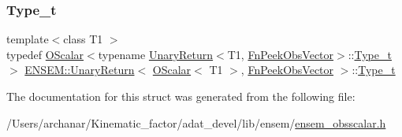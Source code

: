 \subsubsection{\texorpdfstring{Type\_t}{Type\_t}\hspace{0.1cm}{\footnotesize\ttfamily [2/2]}}
{\footnotesize\ttfamily template$<$class T1 $>$ \\
typedef \mbox{\hyperlink{classENSEM_1_1OScalar}{O\+Scalar}}$<$typename \mbox{\hyperlink{structENSEM_1_1UnaryReturn}{Unary\+Return}}$<$T1, \mbox{\hyperlink{structENSEM_1_1FnPeekObsVector}{Fn\+Peek\+Obs\+Vector}}$>$\+::\mbox{\hyperlink{structENSEM_1_1UnaryReturn_3_01OScalar_3_01T1_01_4_00_01FnPeekObsVector_01_4_afbb417d857c687872160aa2c33bf13a2}{Type\+\_\+t}}$>$ \mbox{\hyperlink{structENSEM_1_1UnaryReturn}{E\+N\+S\+E\+M\+::\+Unary\+Return}}$<$ \mbox{\hyperlink{classENSEM_1_1OScalar}{O\+Scalar}}$<$ T1 $>$, \mbox{\hyperlink{structENSEM_1_1FnPeekObsVector}{Fn\+Peek\+Obs\+Vector}} $>$\+::\mbox{\hyperlink{structENSEM_1_1UnaryReturn_3_01OScalar_3_01T1_01_4_00_01FnPeekObsVector_01_4_afbb417d857c687872160aa2c33bf13a2}{Type\+\_\+t}}}



The documentation for this struct was generated from the following file\+:\begin{DoxyCompactItemize}
\item 
/\+Users/archanar/\+Kinematic\+\_\+factor/adat\+\_\+devel/lib/ensem/\mbox{\hyperlink{lib_2ensem_2ensem__obsscalar_8h}{ensem\+\_\+obsscalar.\+h}}\end{DoxyCompactItemize}
